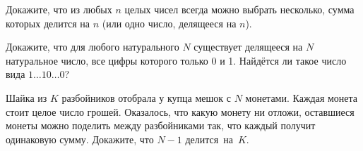 \documentclass[12pt,a4paper]{article}
\begin{document}
Докажите, что из любых $n$ целых чисел всегда можно выбрать несколько,
сумма которых делится на $n$ (или одно число, делящееся на $n$).

 Докажите, что для любого натурального $N$ существует делящееся на $N$ натуральное число,
все цифры которого только 0 и 1.
 Найдётся ли такое число вида $1\ldots10\ldots0$?












Шайка из $K$ разбойников отобрала у купца мешок с $N$ монетами. Каждая монета стоит целое число грошей. Оказалось, что какую монету ни отложи, оставшиеся монеты можно поделить между разбойниками так, что каждый получит одинаковую сумму. Докажите, что $N-1$ делится~на~$K$.




\end{document}
